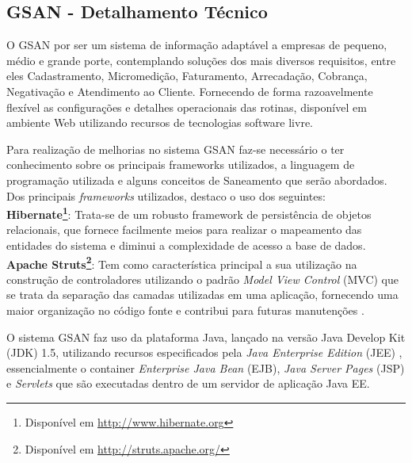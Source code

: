 \subsection{GSAN - Detalhamento Técnico }

O GSAN por ser um sistema de informação adaptável a empresas de pequeno, médio e grande porte, contemplando soluções dos mais diversos requisitos, entre eles Cadastramento, Micromedição, Faturamento, Arrecadação, Cobrança, Negativação e Atendimento ao Cliente. Fornecendo de forma razoavelmente flexível as configurações e detalhes operacionais das rotinas, disponível em ambiente Web utilizando recursos de tecnologias software livre.

Para realização de melhorias no sistema GSAN faz-se necessário o ter conhecimento sobre os principais frameworks utilizados, a linguagem de programação utilizada e alguns conceitos de Saneamento que serão abordados.
Dos principais \textit{frameworks} utilizados, destaco o uso dos seguintes: \\

\textbf{Hibernate\footnote{Disponível em \url{http://www.hibernate.org}}}: Trata-se de um robusto framework de persistência de objetos relacionais, que fornece facilmente meios para realizar o mapeamento das entidades do sistema e diminui a complexidade de acesso a base de dados.\\

\textbf{Apache Struts\footnote{Disponível em \url{http://struts.apache.org/}}}: Tem como característica principal a sua utilização na construção de controladores utilizando o padrão \textit{Model View Control} (MVC) que se trata da separação das camadas utilizadas em uma aplicação, fornecendo uma maior organização no código fonte e contribui para futuras manutenções \cite{fowler2003}. 

O sistema GSAN faz uso da plataforma Java, lançado na versão Java Develop Kit (JDK) 1.5, utilizando recursos especificados pela \textit{Java Enterprise Edition} (JEE) \cite{PORTAL:2014}, essencialmente o container \textit{Enterprise Java Bean} (EJB), \textit{Java Server Pages }(JSP) e \textit{Servlets} que são executadas dentro de um servidor de aplicação Java EE.

